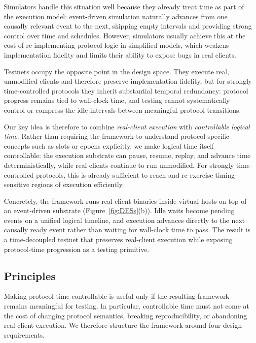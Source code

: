 Simulators handle this situation well because they already treat time as part of the execution model: event-driven simulation naturally advances from one causally relevant event to the next, skipping empty intervals and providing strong control over time and schedules. However, simulators usually achieve this at the cost of re-implementing protocol logic in simplified models, which weakens implementation fidelity and limits their ability to expose bugs in real clients.
  
Testnets occupy the opposite point in the design space. They execute real, unmodified clients and therefore preserve implementation fidelity, but for strongly time-controlled protocols they inherit substantial temporal redundancy: protocol progress remains tied to wall-clock time, and testing cannot systematically control or compress the idle intervals between meaningful protocol transitions.
  
Our key idea is therefore to combine \emph{real-client execution} with \emph{controllable logical time}. Rather than requiring the framework to understand protocol-specific concepts such as slots or epochs explicitly, we make logical time itself controllable: the execution substrate can pause, resume, replay, and advance time deterministically, while real clients continue to run unmodified. For strongly time-controlled protocols, this is already sufficient to reach and re-exercise timing-sensitive regions of execution efficiently.
  
Concretely, the framework runs real client binaries inside virtual hosts on top of an event-driven substrate (Figure~\ref{fig:DESs}(b)). Idle waits become pending events on a unified logical timeline, and execution advances directly to the next causally ready event rather than waiting for wall-clock time to pass. The result is a time-decoupled testnet that preserves real-client execution while exposing protocol-time progression as a testing primitive.
  
\subsection{Principles}
\label{sec:design_principles}
  
Making protocol time controllable is useful only if the resulting framework remains meaningful for testing. In particular, controllable time must not come at the cost of changing protocol semantics, breaking reproducibility, or abandoning real-client execution. We therefore structure the framework around four design requirements.

